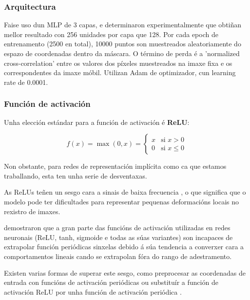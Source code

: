 \subsubsection{Arquitectura}
\label{subsubsec:Arquitectura}

Faise uso dun MLP de 3 capas, e determinaron experimentalmente que obtiñan mellor resultado con 256 unidades por capa que 128.
Por cada epoch de entrenamento (2500 en total), 10000 puntos son muestreados aleatoriamente do espazo de coordenadas dentro da máscara.
O término de perda é a 'normalized cross-correlation' entre os valores dos píxeles muestreados na imaxe fixa e os correspondentes da imaxe móbil.
Utilizan Adam de optimizador, cun learning rate de 0.0001.

\subsubsection{Función de activación}
\label{subsubsec:Función de activación}

Unha elección estándar para a función de activación é \textbf{ReLU}:

\[
f(x) = \max(0, x) = \begin{cases} 
x & \text{si } x > 0 \\ 
0 & \text{si } x \leq 0 
\end{cases}
\]

Non obstante, para redes de representación implícita como ca que estamos traballando, esta ten unha serie de desventaxas.

As ReLUs teñen un sesgo cara a sinais de baixa frecuencia \cite{rahaman2019spectralbiasneuralnetworks}, 
 o que significa que o modelo pode ter dificultades para representar pequenas deformacións locais no rexistro de imaxes.
 
\cite{ziyin2020neuralnetworksfaillearn} demostraron que a gran parte das funcións de activación utilizadas en redes neuronais (ReLU, tanh, sigmoide e todas as súas variantes)
son incapaces de extrapolar función periódicas sinxelas debido á súa tendencia a converxer cara a comportamentos lineais cando se extrapolan fóra do rango de adestramento. 

Existen varias formas de superar este sesgo, como preprocesar as coordenadas de entrada con funcións de activación periódicas \cite{mildenhall2020nerfrepresentingscenesneural} 
ou substituír a función de activación ReLU por unha función de activación periódica \cite{sitzmann2020implicitneuralrepresentationsperiodic}.

